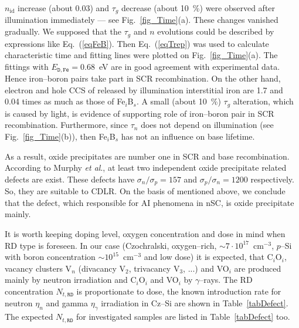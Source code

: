 \documentclass[aip,jap, amsmath,amssymb,reprint]{revtex4-1}
\begin{document}
$n_{\mathrm{id}}$ increase (about 0.03) and $\tau_g$ decrease (about 10~\%) were observed after illumination immediately --- see Fig.~\ref{fig_Time}(a).
These changes vanished gradually.
We supposed that the $\tau_g$ and $n$ evolutions could be described by expressions like Eq.~(\ref{eqFeB}).
Then Eq.~(\ref{eqTrep}) was used to calculate characteristic time and fitting lines were plotted on Fig.~\ref{fig_Time}(a).
The fittings with $E_{\mathtt{D,Fe}}=0.68$~eV are in good agreement with experimental data.
Hence iron--boron pairs take part in SCR recombination.
On the other hand, electron and hole CCS of released by illumination interstitial iron are 1.7 and 0.04 times \cite{MurphyJAP2011} as much as those of Fe$_i$B$_s$.
A small (about 10~\%) $\tau_g$ alteration, which is caused by light, is evidence of supporting role of iron--boron pair in SCR recombination.
Furthermore, since $\tau_n$ does not depend on illumination (see Fig.~\ref{fig_Time}(b)), then Fe$_i$B$_s$ has not an influence on base lifetime.

As a result, oxide precipitates are number one in SCR and base recombination.
According to Murphy \emph{et al}.\cite{MurphySC2014,MurphyJAP2012},
at least two independent oxide precipitate related defects are exist.
These defects have $\sigma_n/\sigma_p=157$ and $\sigma_p/\sigma_n=1200$ respectively.\cite{MurphyJAP2012}
So, they are suitable to CDLR.
On the basis of mentioned above, we conclude that the defect, which responsible for AI phenomena in nSC, is oxide precipitate mainly.

It is worth keeping doping level, oxygen concentration and dose in mind when RD type is foreseen.
In our case (Czochralski, oxygen--rich, $\sim7\cdot10^{17}$~cm$^{-3}$, $p$--Si with boron concentration $\sim10^{15}$~cm$^{-3}$ and low dose)
it is expected, that C$_i$O$_i$, vacancy clusters V$_n$ (divacancy V$_2$, trivacancy V$_3$, ...) and VO$_i$
are produced mainly by neutron irradiation \cite{n:long,n:gamma,Moll:PhD}
and C$_i$O$_i$ and  VO$_i$ by $\gamma$--rays.\cite{gamma:Stahl,Moll:PhD,gamma:Kolk,A:Caracas}
The RD concentration $N_{t,\mathtt{RD}}$ is proportionate to dose,
the known introduction rate for neutron $\eta_n$ and gamma $\eta_\gamma$ irradiation in Cz--Si are shown in Table~\ref{tabDefect}.
The expected $N_{t,\mathtt{RD}}$ for investigated samples are listed in Table~\ref{tabDefect} too.
\end{document}
